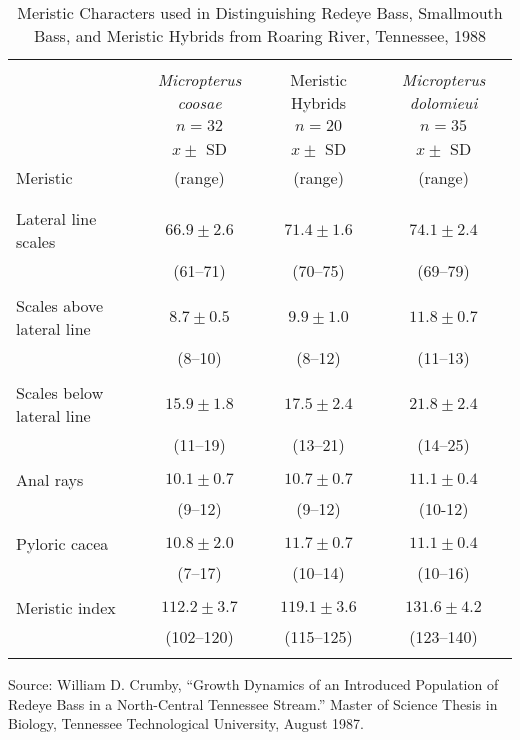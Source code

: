 \begin{sidewaystable}[tbp] 
  \caption{Meristic Characters used in Distinguishing Redeye Bass, Smallmouth Bass, and Meristic Hybrids from Roaring River, Tennessee, 1988}
  \label{tab:MeristicCharacters}
  \centering
  \begin{tabular}{lccc} \hline \hline
    \\
    & \textit{Micropterus coosae} & Meristic Hybrids & \textit{Micropterus dolomieui} \\
    & $n=32$ & $n=20$ & $n=35$ \\\
    & $x\pm$ SD & $x\pm$ SD & $x\pm$ SD \\
    Meristic & (range) & (range) & (range) \\
    \\ \hline
    \\
    Lateral line scales & $66.9 \pm 2.6$ & $71.4 \pm 1.6$ & $74.1 \pm 2.4$ \\
    & (61--71) & (70--75) & (69--79) \\
    \\
    Scales above lateral line & $8.7 \pm 0.5$ & $9.9 \pm 1.0$ & $11.8 \pm 0.7$ \\
    & (8--10) & (8--12) & (11--13) \\
    \\
    Scales below lateral line & $15.9 \pm 1.8$ & $17.5 \pm 2.4$ & $21.8 \pm 2.4$ \\
    & (11--19) & (13--21) & (14--25) \\
    \\
    Anal rays & $10.1 \pm 0.7$ & $10.7 \pm 0.7$ & $11.1 \pm 0.4$ \\
    & (9--12) & (9--12) & (10-12) \\
    \\
    Pyloric cacea & $10.8 \pm 2.0$ & $11.7 \pm 0.7$ & $11.1 \pm 0.4$ \\
    & (7--17) & (10--14) & (10--16) \\
    \\
    Meristic index & $112.2 \pm 3.7$ & $119.1 \pm 3.6$ & $131.6 \pm 4.2$ \\
    & (102--120) & (115--125) & (123--140) \\
    \\ \hline
  \end{tabular}

  \parbox{\textheight}{Source: William D. Crumby, ``Growth Dynamics of
    an Introduced Population of Redeye Bass in a North-Central
    Tennessee Stream.''  Master of Science Thesis in Biology,
    Tennessee Technological University, August 1987.}
\end{sidewaystable}
